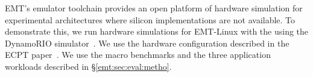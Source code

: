 \noindent
EMT's emulator toolchain provides an open platform of hardware simulation
	for experimental architectures where silicon implementations are not available.
To demonstrate this, we run hardware simulations for EMT-Linux with the 
 using the DynamoRIO simulator~\cite{plat:dynamorio}.
We use the hardware configuration 
described in the ECPT paper~\cite{skarlatos2020ecpt}.
We use the macro benchmarks and the three application workloads described in \S\ref{emt:sec:eval:metho}.

